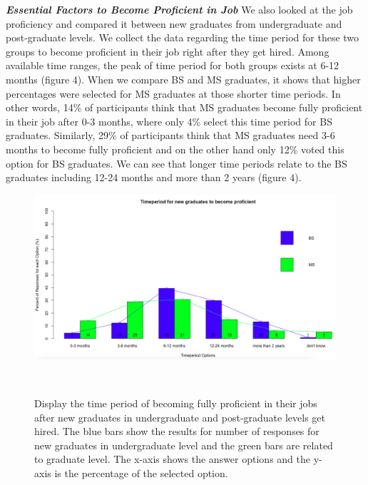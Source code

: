 \documentclass{sigchi}
\begin{document}
\textit{\textbf{Essential Factors to Become Proficient in Job}}\newline
We also looked at the job proficiency and compared it between new graduates from undergraduate and post-graduate levels. We collect the data regarding the time period for these two groups to become proficient in their job right after they get hired. Among available time ranges, the peak of time period for both groups exists at 6-12 months (figure 4). When we compare BS and MS graduates, it shows that higher percentages were selected for MS graduates at those shorter time periods. In other words, 14\% of participants think that MS graduates become fully proficient in their job after 0-3 months, where only 4\% select this time period for BS graduates. Similarly, 29\% of participants think that MS graduates need 3-6 months to become fully proficient and on the other hand only 12\% voted this option for BS graduates. We can see that longer time periods relate to the BS graduates including 12-24 months and more than 2 years (figure 4).

\begin{figure}
\centering
  \includegraphics[width=1.05\columnwidth]{figures/timeperiod_proficiency_BS_MS_with_trendline}
  \caption{Display the time period of becoming fully proficient in their jobs after new graduates in undergraduate and post-graduate levels get hired. The blue bars show the results for number of responses for new graduates in undergraduate level and the green bars are related to graduate level. The x-axis shows the answer options and the y-axis is the percentage of the selected option.}~\label{fig:figure 4}
\end{figure}
\end{document}
